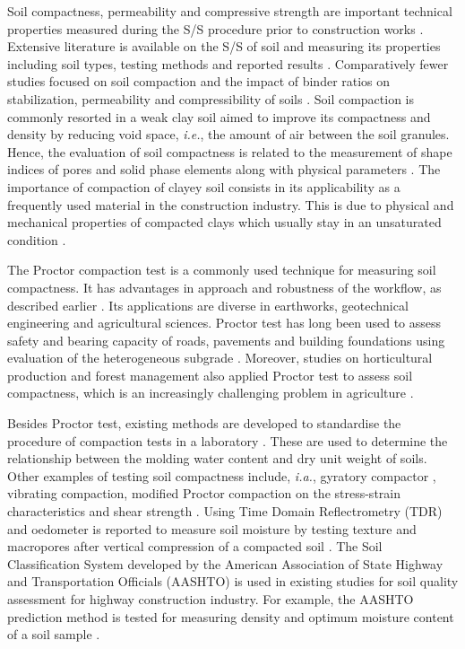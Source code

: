 \documentclass{amestyle}
\begin{document}
Soil compactness, permeability and compressive strength are important technical properties measured during the S/S procedure prior to construction works \cite{LindhWinter,XU2021114774}. Extensive literature is available on the S/S of soil and measuring its properties including soil types, testing methods and reported results \cite{Anagnostopoulos,Kallenetal2016,Lemenkov2021a,HUANG2022115452}. Comparatively fewer studies focused on soil compaction and the impact of binder ratios on stabilization, permeability and compressibility of soils \cite{Kongkitkul,Leeetal2007}. Soil compaction is commonly resorted in a weak clay soil aimed to improve its compactness and density by reducing void space, \emph{i.e.}, the amount of air between the soil granules. Hence, the evaluation of soil compactness is related to the measurement of shape indices of pores and solid phase elements along with physical parameters \cite{Bryk}. The importance of compaction of clayey soil consists in its applicability as a frequently used material in the construction industry. This is due to physical and mechanical properties of compacted clays which usually stay in an unsaturated condition \cite{Zou}. 

The Proctor compaction test is a commonly used technique for measuring soil compactness. It has advantages in approach and robustness of the workflow, as described earlier \cite{Wasman,Matteo,Boudlal}. Its applications are diverse in earthworks, geotechnical engineering and agricultural sciences. Proctor test has long been used to assess safety and bearing capacity of roads, pavements and building foundations using evaluation of the heterogeneous subgrade \cite{Barden,Jibon}. Moreover, studies on horticultural production and forest management also applied Proctor test to assess soil compactness, which is an increasingly challenging problem in agriculture \cite{ARAGON2000197,Bayat,Nhantumbo,ALAOUI20111}. 

Besides Proctor test, existing methods are developed to standardise the procedure of compaction tests in a laboratory \cite{ASTM2007,ASTM2009}. These are used to determine the relationship between the molding water content and dry unit weight of soils. Other examples of testing soil compactness include, \emph{i.a.}, gyratory compactor \cite{Leeetal2007}, vibrating compaction, modified Proctor compaction on the stress-strain characteristics and shear strength \cite{Long}. Using Time Domain Reflectrometry (TDR) and oedometer is reported to measure soil moisture by testing texture and macropores after vertical compression of a compacted soil \cite{Alaoui}. The Soil Classification System developed by the American Association of State Highway and Transportation Officials (AASHTO) is used in existing studies for soil quality assessment for highway construction industry. For example, the AASHTO prediction method is tested for measuring density and optimum moisture content of a soil sample \cite{Livneh}. 
\end{document}
